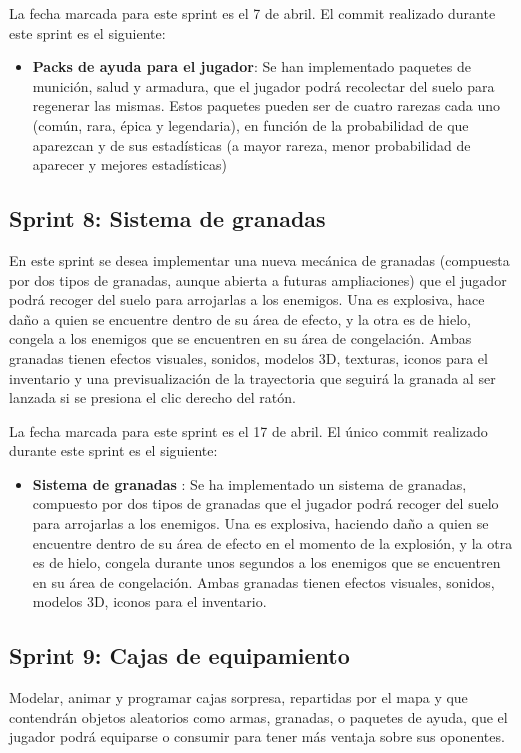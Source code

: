 La fecha marcada para este sprint es el 7 de abril. El commit realizado durante este sprint es el siguiente:
\begin{itemize}
    \item \textbf{Packs de ayuda para el jugador}: Se han implementado paquetes de munición, salud y armadura, que el jugador podrá recolectar del suelo para regenerar las mismas. Estos paquetes pueden ser de cuatro rarezas cada uno (común, rara, épica y legendaria), en función de la probabilidad de que aparezcan y de sus estadísticas (a mayor rareza, menor probabilidad de aparecer y mejores estadísticas)
\end{itemize}
\subsection{Sprint 8: Sistema de granadas}
En este sprint se desea implementar una nueva mecánica de granadas (compuesta por dos tipos de granadas, aunque abierta a futuras ampliaciones) que el jugador podrá recoger del suelo para arrojarlas a los enemigos. Una es explosiva, hace daño a quien se encuentre dentro de su área de efecto, y la otra es de hielo, congela a los enemigos que se encuentren en su área de congelación. Ambas granadas tienen efectos visuales, sonidos, modelos 3D, texturas, iconos para el inventario y una previsualización de la trayectoria que seguirá la granada al ser lanzada si se presiona el clic derecho del ratón.

La fecha marcada para este sprint es el 17 de abril. El único commit realizado durante este sprint es el siguiente:
\begin{itemize}
    \item \textbf{Sistema de granadas} : Se ha implementado un sistema de granadas, compuesto por dos tipos de granadas que el jugador podrá recoger del suelo para arrojarlas a los enemigos. Una es explosiva, haciendo daño a quien se encuentre dentro de su área de efecto en el momento de la explosión, y la otra es de hielo, congela durante unos segundos a los enemigos que se encuentren en su área de congelación. Ambas granadas tienen efectos visuales, sonidos, modelos 3D, iconos para el inventario.
\end{itemize}
\subsection{Sprint 9: Cajas de equipamiento}
Modelar, animar y programar cajas sorpresa, repartidas por el mapa y que contendrán objetos aleatorios como armas, granadas, o paquetes de ayuda, que el jugador podrá equiparse o consumir para tener más ventaja sobre sus oponentes.

